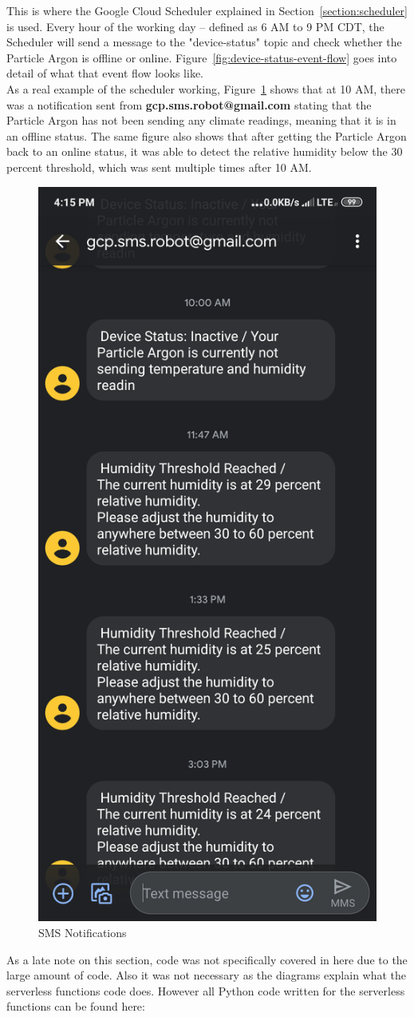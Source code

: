 \documentclass{article}
\begin{document}
This is where the Google Cloud Scheduler explained in Section~\ref{section:scheduler} is used. Every hour of the working day -- defined as 6 AM to 9 PM CDT, the Scheduler will send a message to the "device-status" topic and check whether the Particle Argon is offline or online. Figure~\ref{fig:device-status-event-flow} goes into detail of what that event flow looks like.\\

As a real example of the scheduler working, Figure~\ref{fig:notifications} shows that at 10 AM, there was a notification sent from \textbf{gcp.sms.robot@gmail.com} stating that the Particle Argon has not been sending any climate readings, meaning that it is in an offline status. The same figure also shows that after getting the Particle Argon back to an online status, it was able to detect the relative humidity below the 30 percent threshold, which was sent multiple times after 10 AM.\\

\begin{figure}[H]
	\center
	\includegraphics[width=.4\textwidth]{images/sms-notifications.png}
	\caption{SMS Notifications}
	\label{fig:notifications}
\end{figure}

As a late note on this section, code was not specifically covered in here due to the large amount of code. Also it was not necessary as the diagrams explain what the serverless functions code does. However all Python code written for the serverless functions can be found here:\\
\end{document}
